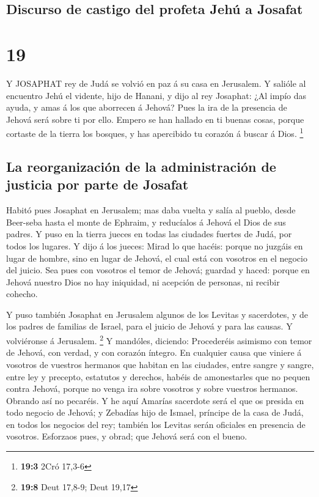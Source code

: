\hypertarget{discurso-de-castigo-del-profeta-jehuxfa-a-josafat}{%
\subsection{Discurso de castigo del profeta Jehú a
Josafat}\label{discurso-de-castigo-del-profeta-jehuxfa-a-josafat}}

\hypertarget{section-18}{%
\section{19}\label{section-18}}

 Y JOSAPHAT rey de Judá se volvió en paz á su casa en
Jerusalem.  Y salióle al encuentro Jehú el vidente, hijo de
Hanani, y dijo al rey Josaphat: ¿Al impío das ayuda, y amas á los que
aborrecen á Jehová? Pues la ira de la presencia de Jehová será sobre ti
por ello.  Empero se han hallado en ti buenas cosas, porque
cortaste de la tierra los bosques, y has apercibido tu corazón á buscar
á Dios. \footnote{\textbf{19:3} 2Cró 17,3-6}

\hypertarget{la-reorganizaciuxf3n-de-la-administraciuxf3n-de-justicia-por-parte-de-josafat}{%
\subsection{La reorganización de la administración de justicia por parte
de
Josafat}\label{la-reorganizaciuxf3n-de-la-administraciuxf3n-de-justicia-por-parte-de-josafat}}

 Habitó pues Josaphat en Jerusalem; mas daba vuelta y salía
al pueblo, desde Beer-seba hasta el monte de Ephraim, y reducíalos á
Jehová el Dios de sus padres.  Y puso en la tierra jueces en
todas las ciudades fuertes de Judá, por todos los lugares. 
Y dijo á los jueces: Mirad lo que hacéis: porque no juzgáis en lugar de
hombre, sino en lugar de Jehová, el cual está con vosotros en el negocio
del juicio.  Sea pues con vosotros el temor de Jehová;
guardad y haced: porque en Jehová nuestro Dios no hay iniquidad, ni
acepción de personas, ni recibir cohecho.

 Y puso también Josaphat en Jerusalem algunos de los Levitas
y sacerdotes, y de los padres de familias de Israel, para el juicio de
Jehová y para las causas. Y volviéronse á Jerusalem. \footnote{\textbf{19:8}
  Deut 17,8-9; Deut 19,17}  Y mandóles, diciendo:
Procederéis asimismo con temor de Jehová, con verdad, y con corazón
íntegro.  En cualquier causa que viniere á vosotros de
vuestros hermanos que habitan en las ciudades, entre sangre y sangre,
entre ley y precepto, estatutos y derechos, habéis de amonestarles que
no pequen contra Jehová, porque no venga ira sobre vosotros y sobre
vuestros hermanos. Obrando así no pecaréis.  Y he aquí
Amarías sacerdote será el que os presida en todo negocio de Jehová; y
Zebadías hijo de Ismael, príncipe de la casa de Judá, en todos los
negocios del rey; también los Levitas serán oficiales en presencia de
vosotros. Esforzaos pues, y obrad; que Jehová será con el bueno.

